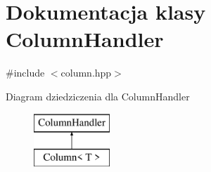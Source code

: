 \hypertarget{class_column_handler}{}\section{Dokumentacja klasy Column\+Handler}
\label{class_column_handler}


{\ttfamily \#include $<$column.\+hpp$>$}

Diagram dziedziczenia dla Column\+Handler\begin{figure}[H]
\begin{center}
\leavevmode
\includegraphics[height=2.000000cm]{class_column_handler}
\end{center}
\end{figure}
